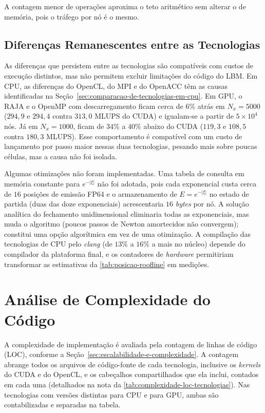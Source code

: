 A contagem menor de operações aproxima o teto aritmético sem alterar o de memória, pois o tráfego por nó é o mesmo.

\subsection{Diferenças Remanescentes entre as Tecnologias}\label{subsec:diferencas-persistentes}

As diferenças que persistem entre as tecnologias são compatíveis com custos de execução distintos, mas não permitem excluir limitações do código do LBM.
Em CPU, as diferenças do OpenCL, do MPI e do OpenACC têm as causas identificadas na Seção~\ref{sec:comparacao-de-tecnologias-em-cpu}.
Em GPU, o RAJA e o OpenMP com descarregamento ficam cerca de \(6\%\) atrás em \(N_x = 5000\) (\(294{,}9\) e \(294{,}4\) contra \(313{,}0\) MLUPS do CUDA) e igualam-se a partir de \(5 \times 10^4\) nós.
Já em \(N_x = 1000\), ficam de \(34\%\) a \(40\%\) abaixo do CUDA (\(119{,}3\) e \(108{,}5\) contra \(180{,}3\) MLUPS).
Esse comportamento é compatível com um custo de lançamento por passo maior nessas duas tecnologias, pesando mais sobre poucas células, mas a causa não foi isolada.

Algumas otimizações não foram implementadas.
Uma tabela de consulta em memória constante para \(e^{-|\xi|}\) não foi adotada, pois cada exponencial custa cerca de \(16\) posições de emissão FP64 e o armazenamento de \(E = e^{-|\xi|}\) no estado de partida (duas das doze exponenciais) acrescentaria \(16\) \textit{bytes} por nó.
A solução analítica do fechamento unidimensional eliminaria todas as exponenciais, mas muda o algoritmo (poucos passos de Newton amortecidos não convergem); constitui uma opção algorítmica em vez de uma otimização.
A compilação das tecnologias de CPU pelo \textit{clang} (de \(13\%\) a \(16\%\) a mais no núcleo) depende do compilador da plataforma final, e os contadores de \textit{hardware} permitiriam transformar as estimativas da \autoref{tab:posicao-roofline} em medições.


\section{Análise de Complexidade do Código}\label{sec:analise-de-complexidade-do-codigo}

A complexidade de implementação é avaliada pela contagem de linhas de código (LOC), conforme a Seção~\ref{sec:escalabilidade-e-complexidade}.
A contagem abrange todos os arquivos de código-fonte de cada tecnologia, inclusive os \textit{kernels} do CUDA e do OpenCL, e os cabeçalhos compartilhados que ela inclui, contados em cada uma (detalhados na nota da \autoref{tab:complexidade-loc-tecnologias}).
Nas tecnologias com versões distintas para CPU e para GPU, ambas são contabilizadas e separadas na tabela.


